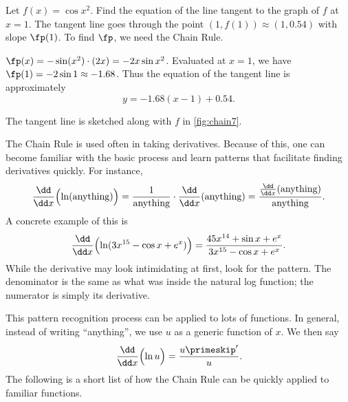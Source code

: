 \begin{example}\label{ex_chain7}
Let $f(x) = \cos x^2$. Find the equation of the line tangent to the graph of $f$ at $x=1$.
\solution
The tangent line goes through the point $(1,f(1)) \approx (1,0.54)$ with slope $\fp(1)$. To find $\fp$, we need the Chain Rule.

$\fp(x) = -\sin(x^2) \cdot(2x) = -2x\sin x^2$. Evaluated at $x=1$, we have $\fp(1) = -2\sin 1\approx -1.68$. Thus the equation of the tangent line is approximately
%
%
\[y = -1.68(x-1)+0.54.\]

The tangent line is sketched along with $f$ in \autoref{fig:chain7}.
\end{example}

The Chain Rule is used often in taking derivatives. Because of this, one can become familiar with the basic process and learn  patterns that facilitate finding derivatives quickly. For instance,
\[
 \frac{\dd}{\dd x}\Bigl(\ln (\text{anything})\Bigr)
 = \frac{1}{\text{anything}}\cdot\frac{\dd}{\dd x}(\text{anything})
 = \frac{\frac{\dd}{\dd x}(\text{anything})}{\text{anything}}.
\]
A concrete example of this is
\[
\frac{\dd}{\dd x}\Bigl(\ln(3x^{15}-\cos x+e^x)\Bigr)
= \frac{45x^{14}+\sin x+e^x}{3x^{15}-\cos x+e^x}.
\]
While the derivative may  look intimidating at first, look for the pattern. The denominator is the same as what was inside the natural log function; the  numerator is simply its derivative.

This pattern recognition process can be applied to lots of functions. In general, instead of writing ``anything'', we use $u$ as a generic function of $x$. We then say \[\frac{\dd}{\dd x}\Bigl(\ln u\Bigr) = \frac{u\primeskip'}{u}.\]
The following is a short list of how the Chain Rule can be quickly applied to familiar functions.

